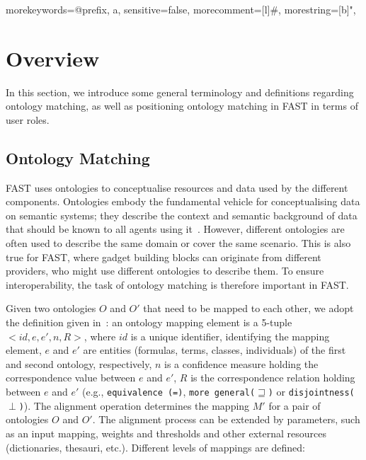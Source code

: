 
\lstset{
captionpos=b, 
extendedchars=true,
basicstyle=\scriptsize \sffamily, 
stringstyle=\bfseries,
frame=single,
frameround=tttt,
showstringspaces=false,
breaklines=true,
}

{morekeywords={@prefix, a}, 
sensitive=false, 
morecomment=[l]{\#}, 
morestring=[b]",
}

\section{Overview}
\label{sec:overview}

In this section, we introduce some general terminology and definitions regarding ontology matching, as well as positioning ontology matching in FAST in terms of user roles.

\subsection{Ontology Matching}
\label{mediation}

FAST uses ontologies to conceptualise resources and data used by the different components.
Ontologies embody the fundamental vehicle for conceptualising data on semantic systems; they describe the context and semantic background of data that should be known to all agents using it~\cite{gruber93towards}.
However, different ontologies are often used to describe the same domain or cover the same scenario. This is also true for FAST, where gadget building blocks can originate from different providers, who might use different ontologies to describe them. To ensure interoperability, the task of ontology matching is therefore important in FAST.

Given two ontologies $O$ and $O'$ that need to be mapped to each other, we adopt the definition given in~\cite{shvaiko2005schema_based}: an ontology mapping element is a 5-tuple $<id, e, e', n, R>$, where 
$id$ is a unique identifier, identifying the
mapping element, 
$e$ and $e'$ are entities (formulas, terms, classes, individuals) of the first and second ontology, respectively, 
$n$ is a confidence measure holding the correspondence value between $e$ and
$e'$, 
$R$ is the correspondence relation holding between $e$ and $e'$ (e.g., \texttt{equivalence (=)}, \texttt{more general($\sqsupseteq$)} or \texttt{disjointness($\perp$)}).
The alignment operation determines the mapping $M'$ for a pair of ontologies $O$ and $O'$. The alignment process can be extended by parameters, such as an input mapping, weights and thresholds and other external resources (dictionaries, thesauri, etc.). Different levels of mappings are defined:

